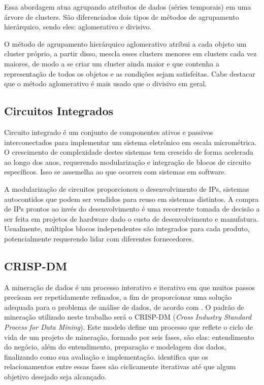 \documentclass[conference,compsoc]{IEEEtran}
\begin{document}
Essa abordagem atua agrupando atributos de dados (séries temporais) em uma árvore de clusters. São diferenciados dois tipos de métodos de agrupamento hierárquico, sendo eles: aglomerativo e divisivo. 

O método de agrupamento hierárquico aglomerativo atribui a cada objeto um cluster próprio, a partir disso, mescla esses clusters menores em clusters cada vez maiores, de modo a se criar um cluster ainda maior e que contenha a representação de todos os objetos e as condições sejam satisfeitas. Cabe destacar que o método aglomerativo é mais usado que o divisivo em geral.

\subsection{Circuitos Integrados}

Circuito integrado é um conjunto de componentes ativos e passivos interconectados para implementar um sistema eletrônico em escala micrométrica. O crescimento de complexidade destes sistemas tem crescido de forma acelerada ao longo dos anos, requerendo modularização e integração de blocos de circuito específicos. Isso se assemelha ao que ocorreu com sistemas em software.

A modularização de circuitos proporcionou o desenvolvimento de IPs, sistemas autocontidos que podem ser vendidos para reuso em sistemas distintos. A compra de IPs prontos ao invés do desenvolvimento é uma recorrente tomada de decisão a ser feita em projetos de hardware dado o custo de desenvolvimento e manufatura. Usualmente, múltiplos blocos independentes são integrados para cada produto, potencialmente requerendo lidar com diferentes fornecedores.

\subsection{CRISP-DM}
A mineração de dados é um processo interativo e iterativo em que muitos passos precisam ser repetidamente refinados, a fim de proporcionar uma solução adequada para o problema de análise de dados, de acordo com \citet{wang_data_2008}. O padrão de mineração utilizado neste trabalho será o CRISP-DM (\textit{Cross Industry Standard Process for Data Mining}). Este modelo define um processo que reflete o ciclo de vida de um projeto de mineração, formado por seis fases, são elas: entendimento do negócio, além do entendimento, preparação e modelagem dos dados, finalizando como sua avaliação e implementação. \citet{kononenko_machine_2007} identifica que os relacionamentos entre essas fases são ciclicamente iterativas até que algum objetivo desejado seja alcançado. 
\end{document}
